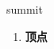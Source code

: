 
\begin{frame}
{\huge summit}
\begin{center}
\begin{enumerate}\Large
  \item \textbf{顶点}
\end{enumerate}
\end{center}
\end{frame}

